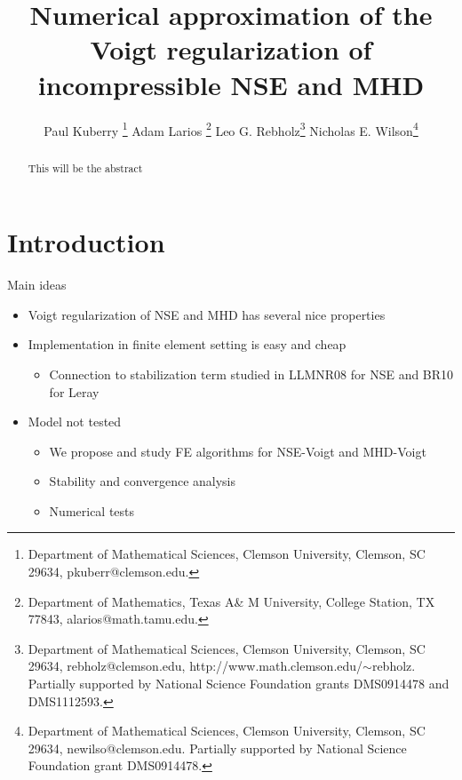 \documentclass[11pt]{article}%
\numberwithin{equation}{section}
\begin{document}
\title{Numerical approximation of the Voigt regularization of incompressible NSE and MHD}

\author{
Paul Kuberry \footnote{Department of Mathematical Sciences, Clemson University, Clemson, SC 29634, pkuberr@clemson.edu.} \hspace{.25in}
Adam Larios \footnote{Department of Mathematics, Texas A\& M University, College Station, TX 77843, alarios@math.tamu.edu.} \hspace{.25in}
Leo G. Rebholz\footnote{Department of Mathematical Sciences, Clemson University, Clemson, SC 29634, rebholz@clemson.edu, http://www.math.clemson.edu/$\sim$rebholz. Partially supported by National Science Foundation grants DMS0914478 and DMS1112593.}\hspace{.25in}
Nicholas E. Wilson\footnote{Department of Mathematical Sciences, Clemson University, Clemson, SC 29634, newilso@clemson.edu. Partially supported by National Science Foundation grant DMS0914478.}\hspace{.25in}
}
\date{}

\maketitle



\begin{abstract}
This will be the abstract
\end{abstract}

\section{Introduction}

Main ideas
\begin{itemize}
\item Voigt regularization of NSE and MHD has several nice properties
\item Implementation in finite element setting is easy and cheap
\begin{itemize}
\item Connection to stabilization term studied in LLMNR08 for NSE and BR10 for Leray
\end{itemize}
\item Model not tested
\begin{itemize}
\item We propose and study FE algorithms for NSE-Voigt and MHD-Voigt
\item Stability and convergence analysis
\item Numerical tests
\end{itemize}
\end{itemize}
\end{document}

